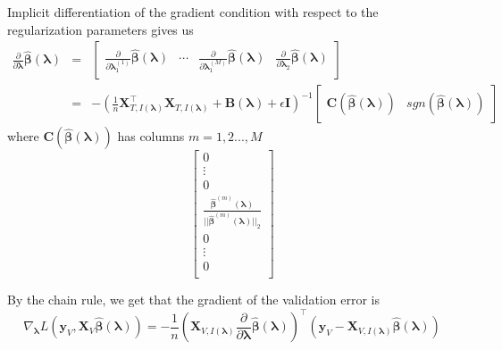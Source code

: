 \documentclass[12pt,letterpaper]{article}
\begin{document}
Implicit differentiation of the gradient condition with respect to the regularization parameters gives us 
\begin{equation}
\begin{array}{lcl}
\frac{\partial }{\partial \boldsymbol \lambda} \hat {\boldsymbol \beta}(\boldsymbol \lambda)
&=& \begin{bmatrix}
\frac{\partial}{\partial \boldsymbol \lambda_1^{(1)}}\hat {\boldsymbol \beta}(\boldsymbol \lambda) &
\cdots &
\frac{\partial}{\partial \boldsymbol \lambda_1^{(M)}}\hat {\boldsymbol \beta}(\boldsymbol \lambda) &
\frac{\partial}{\partial \boldsymbol \lambda_2}\hat {\boldsymbol \beta}(\boldsymbol \lambda)
\end{bmatrix}\\
&=& - \left (
\frac{1}{n} \boldsymbol X_{T, I(\boldsymbol \lambda)}^\top \boldsymbol X_{T, I(\boldsymbol \lambda)} + \boldsymbol B(\boldsymbol \lambda) + \epsilon \boldsymbol I
\right )^{-1}
\begin{bmatrix}
\boldsymbol C(\hat{\boldsymbol \beta}(\boldsymbol \lambda)) & sgn(\hat {\boldsymbol \beta}(\boldsymbol \lambda))
\end{bmatrix}
\end{array}
\end{equation}
where $\boldsymbol C(\hat {\boldsymbol \beta}(\boldsymbol \lambda))$ has columns $m=1,2...,M$
\begin{equation}
\begin{bmatrix}
0 \\
\vdots\\
0\\
\frac{\hat {\boldsymbol \beta}^{(m)}(\boldsymbol \lambda)}{||\hat{\boldsymbol \beta}^{(m)}(\boldsymbol \lambda)||_2}\\
0\\
\vdots\\
0\\
\end{bmatrix}
\end{equation}

By the chain rule, we get that the gradient of the validation error is
\begin{equation}
\nabla_{\boldsymbol \lambda} L(\boldsymbol y_V, \boldsymbol X_V \hat {\boldsymbol \beta}(\boldsymbol \lambda)) =
- \frac{1}{n}
\left (
\boldsymbol X_{V, I(\boldsymbol \lambda)}
\frac{\partial}{\partial \boldsymbol \lambda}\hat {\boldsymbol \beta}(\boldsymbol \lambda)
\right )^\top
(\boldsymbol y_V - \boldsymbol X_{V, I(\boldsymbol \lambda)} \hat {\boldsymbol \beta}(\boldsymbol \lambda) )
\end{equation}
\end{document}
